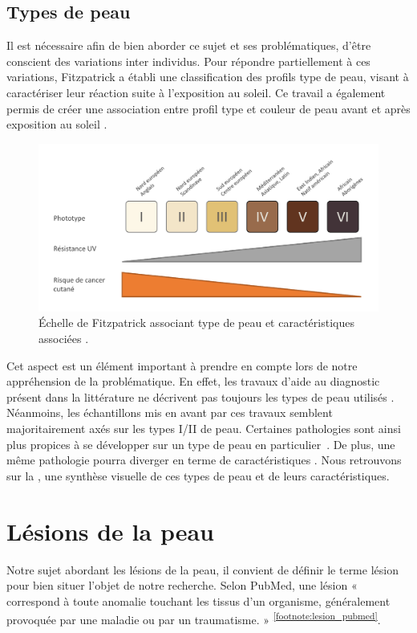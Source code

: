 \subsection{Types de peau}
Il est nécessaire afin de bien aborder ce sujet et ses problématiques, d’être conscient des variations inter individus. Pour répondre partiellement à ces variations, Fitzpatrick a établi une classification des profils type de peau, visant à caractériser leur réaction suite à l’exposition au soleil. Ce travail a également permis de créer une association entre profil type et couleur de peau avant et après exposition au soleil \cite{Fitzpatrick1988}. 
\begin{figure}[H]
    \centering
    \includegraphics[width=\linewidth]{contents/chapter_1/resources/scheme_fitzpatrick_scale.pdf}
    \caption{Échelle de Fitzpatrick associant type de peau et caractéristiques associées \cite{Fitzpatrick1988}.}
    \label{fig:scheme_fitzpatrick_scale}
\end{figure}
Cet aspect est un élément important à prendre en compte lors de notre appréhension de la problématique. En effet, les travaux d'aide au diagnostic présent dans la littérature ne décrivent pas toujours les types de peau utilisés \cite{Celebi2007,Wiltgen2008,Koller2011}. Néanmoins, les échantillons mis en avant par ces travaux semblent majoritairement axés sur les types I/II de peau. Certaines pathologies sont ainsi plus propices à se développer sur un type de peau en particulier~\cite{Narayanan2010}. De plus, une même pathologie pourra diverger en terme de caractéristiques \cite{Tuma2015}. Nous retrouvons sur la , une synthèse visuelle de ces types de peau et de leurs caractéristiques.

\section{Lésions de la peau}
Notre sujet abordant les lésions de la peau, il convient de définir le terme lésion pour bien situer l’objet de notre recherche. Selon PubMed, une lésion « correspond à toute anomalie touchant les tissus d’un organisme, généralement provoquée par une maladie ou par un traumatisme. » \textsuperscript{\ref{footnote:lesion_pubmed}}.\par
\addtocounter{footnote}{1}

